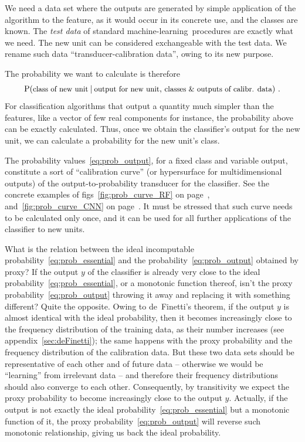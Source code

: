 \documentclass[\ifafour a4paper,12pt,\else a5paper,10pt,\fi%
onecolumn,oneside,article,%
british%
]{memoir}
\theoremstyle{remark}
\theoremstyle{innote}
\newcommand*{\amp}{\&}
\renewcommand*{\P}{\mathrm{P}}%
\renewcommand*{\|}[1][]{\nonscript\:#1\vert\nonscript\:\mathopen{}}
\newcommand*{\figs}{figs}%
\newcommand*{\texts}[1]{\text{\small #1}}
\newcommand*{\ml}{machine-learning}
\begin{document}
We need a data set where the outputs are generated by simple application of the algorithm to the feature, as it would occur in its concrete use, and the classes are known. The \emph{test data} of standard \ml\ procedures are exactly what we need. The new unit can be considered exchangeable with the test data. We rename such data \enquote{transducer-calibration data}, owing to its new purpose.

The probability we want to calculate is therefore
\begin{equation}
  \label{eq:prob_output}
  \P(\texts{class of new unit} \| \texts{output for new unit},\,
  \texts{classes \amp\ outputs of calibr. data}) \ .
\end{equation}
For classification algorithms that output a quantity much simpler than the features, like a vector of few real components for instance, the probability above can be exactly calculated. Thus, once we obtain the classifier's output for the new unit, we can calculate a probability for the new unit's class.


The probability values~\eqref{eq:prob_output}, for a fixed class and variable output, constitute a sort of \enquote{calibration curve} (or hypersurface for multidimensional outputs) of the output-to-probability transducer for the classifier. See the concrete examples of \figs~\ref{fig:prob_curve_RF} on page~\pageref{fig:prob_curve_RF}, and~\ref{fig:prob_curve_CNN} on page~\pageref{fig:prob_curve_CNN}. It must be stressed that such curve needs to be calculated only once, and it can be used for all further applications of the classifier to new units.

\medskip

What is the relation between the ideal incomputable probability~\eqref{eq:prob_essential} and the probability~\eqref{eq:prob_output} obtained by proxy? If the output $y$ of the classifier is already very close to the ideal probability~\eqref{eq:prob_essential}, or a monotonic function thereof, isn't the proxy probability~\eqref{eq:prob_output} throwing it away and replacing it with something different? Quite the opposite. Owing to de~Finetti's theorem, if the output $y$ is almost identical with the ideal probability, then it becomes increasingly close to the frequency distribution of the training data, as their number increases (see appendix~\ref{sec:deFinetti}); the same happens with the proxy probability and the frequency distribution of the calibration data. But these two data sets should be representative of each other and of future data -- otherwise we would be \enquote{learning} from irrelevant data -- and therefore their frequency distributions should also converge to each other. Consequently, by transitivity we expect the proxy probability to become increasingly close to the output $y$. Actually, if the output is not exactly the ideal probability~\eqref{eq:prob_essential} but a monotonic function of it, the proxy probability~\eqref{eq:prob_output} will reverse such monotonic relationship, giving us back the ideal probability.
\end{document}
